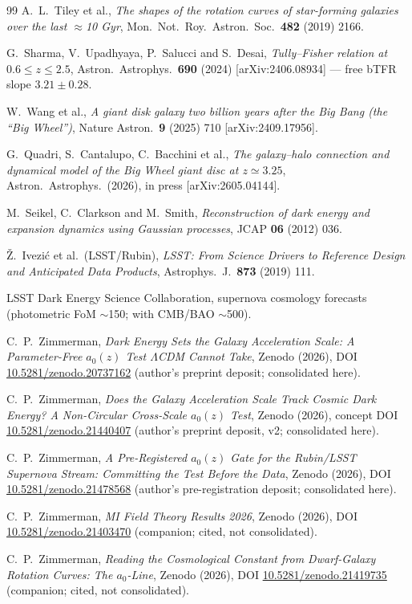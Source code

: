 \documentclass[11pt,a4paper]{article}
\newcommand{\azero}{a_0}
\begin{document}
\begin{thebibliography}{99}
 A.~L.~Tiley et al.,
\emph{The shapes of the rotation curves of star-forming galaxies over the
last $\approx$10 Gyr}, Mon.\ Not.\ Roy.\ Astron.\ Soc.\ \textbf{482} (2019)
2166.

 G.~Sharma, V.~Upadhyaya, P.~Salucci and S.~Desai,
\emph{Tully--Fisher relation at $0.6\le z\le2.5$},
Astron.\ Astrophys.\ \textbf{690} (2024) [arXiv:2406.08934] --- free bTFR
slope $3.21\pm0.28$.

 W.~Wang et al.,
\emph{A giant disk galaxy two billion years after the Big Bang (the ``Big
Wheel'')}, Nature Astron.\ \textbf{9} (2025) 710 [arXiv:2409.17956].

 G.~Quadri, S.~Cantalupo, C.~Bacchini et al.,
\emph{The galaxy--halo connection and dynamical model of the Big Wheel giant
disc at $z\simeq3.25$}, Astron.\ Astrophys.\ (2026), in press
[arXiv:2605.04144].

 M.~Seikel, C.~Clarkson and M.~Smith,
\emph{Reconstruction of dark energy and expansion dynamics using Gaussian
processes}, JCAP \textbf{06} (2012) 036.

 \v{Z}.~Ivezi\'c et al.\ (LSST/Rubin),
\emph{LSST: From Science Drivers to Reference Design and Anticipated Data
Products}, Astrophys.\ J.\ \textbf{873} (2019) 111.

 LSST Dark Energy Science Collaboration,
supernova cosmology forecasts (photometric FoM $\sim$150; with CMB/BAO
$\sim$500).

 C.~P.~Zimmerman,
\emph{Dark Energy Sets the Galaxy Acceleration Scale: A Parameter-Free
$\azero(z)$ Test $\Lambda$CDM Cannot Take}, Zenodo (2026),
DOI \href{https://doi.org/10.5281/zenodo.20737162}{10.5281/zenodo.20737162}
(author's preprint deposit; consolidated here).

 C.~P.~Zimmerman,
\emph{Does the Galaxy Acceleration Scale Track Cosmic Dark Energy? A
Non-Circular Cross-Scale $\azero(z)$ Test}, Zenodo (2026), concept DOI
\href{https://doi.org/10.5281/zenodo.21440407}{10.5281/zenodo.21440407}
(author's preprint deposit, v2; consolidated here).

 C.~P.~Zimmerman,
\emph{A Pre-Registered $\azero(z)$ Gate for the Rubin/LSST Supernova Stream:
Committing the Test Before the Data}, Zenodo (2026),
DOI \href{https://doi.org/10.5281/zenodo.21478568}{10.5281/zenodo.21478568}
(author's pre-registration deposit; consolidated here).

 C.~P.~Zimmerman,
\emph{MI Field Theory Results 2026}, Zenodo (2026),
DOI \href{https://doi.org/10.5281/zenodo.21403470}{10.5281/zenodo.21403470}
(companion; cited, not consolidated).

 C.~P.~Zimmerman,
\emph{Reading the Cosmological Constant from Dwarf-Galaxy Rotation Curves:
The $\azero$-Line}, Zenodo (2026),
DOI \href{https://doi.org/10.5281/zenodo.21419735}{10.5281/zenodo.21419735}
(companion; cited, not consolidated).

\end{thebibliography}
\end{document}
